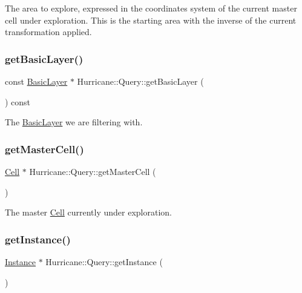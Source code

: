 The area to explore, expressed in the coordinates system of the current master cell under exploration. This is the starting area with the inverse of the current transformation applied. \mbox{\label{classHurricane_1_1Query_ac683152bccef813184e572806e4c14f4}} 
\subsubsection{\texorpdfstring{get\+Basic\+Layer()}{getBasicLayer()}}
{\footnotesize\ttfamily const \mbox{\hyperlink{classHurricane_1_1BasicLayer}{Basic\+Layer}} $\ast$ Hurricane\+::\+Query\+::get\+Basic\+Layer (\begin{DoxyParamCaption}{ }\end{DoxyParamCaption}) const\hspace{0.3cm}{\ttfamily [inline]}}

The \mbox{\hyperlink{classHurricane_1_1BasicLayer}{Basic\+Layer}} we are filtering with. \mbox{\label{classHurricane_1_1Query_add13f7ff193df6ce5223f9761b6cba69}} 
\subsubsection{\texorpdfstring{get\+Master\+Cell()}{getMasterCell()}}
{\footnotesize\ttfamily \mbox{\hyperlink{classHurricane_1_1Cell}{Cell}} $\ast$ Hurricane\+::\+Query\+::get\+Master\+Cell (\begin{DoxyParamCaption}{ }\end{DoxyParamCaption})\hspace{0.3cm}{\ttfamily [inline]}}

The master \mbox{\hyperlink{classHurricane_1_1Cell}{Cell}} currently under exploration. \mbox{\label{classHurricane_1_1Query_a459b9f175f77fce91963eeb192c6e018}} 
\subsubsection{\texorpdfstring{get\+Instance()}{getInstance()}}
{\footnotesize\ttfamily \mbox{\hyperlink{classHurricane_1_1Instance}{Instance}} $\ast$ Hurricane\+::\+Query\+::get\+Instance (\begin{DoxyParamCaption}{ }\end{DoxyParamCaption})\hspace{0.3cm}{\ttfamily [inline]}}

